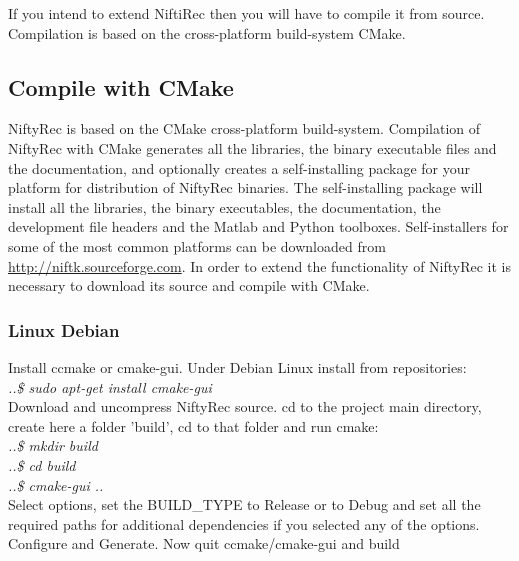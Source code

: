 \documentclass[12pt,a4paper]{report}
\begin{document}
If you intend to extend NiftiRec then you will have to compile it from source. Compilation is based on the 
cross-platform build-system CMake.\\


\subsection{Compile with CMake}
NiftyRec is based on the CMake cross-platform build-system.  
Compilation of NiftyRec with CMake generates all the libraries, the binary executable files and the documentation, 
and optionally creates a self-installing package for your platform for distribution of NiftyRec binaries. 
The self-installing package will install all the libraries, the binary executables, the documentation,  
the development file headers and the Matlab and Python toolboxes. Self-installers for some of the most 
common platforms can be downloaded from \url{http://niftk.sourceforge.com}.
In order to extend the functionality of NiftyRec it is necessary to download its source and compile 
with CMake. 

\subsubsection{Linux Debian}
\noindent Install ccmake or cmake-gui. Under Debian Linux install from repositories: \\
   
   \emph {..\$ sudo apt-get install cmake-gui}\\

\noindent Download and uncompress NiftyRec source. cd to the 
   project main directory, create here a folder 'build', cd to that folder 
   and run cmake: \\

   \emph {..\$ mkdir build}\\
\indent   \emph {..\$ cd build}\\
\indent   \emph {..\$ cmake-gui ..}\\

\noindent    Select options, set the BUILD\_TYPE to Release or to Debug and set all the required 
   paths for additional dependencies if you selected any of the options. 
   Configure and Generate. Now quit ccmake/cmake-gui and build\\
  
\end{document}

